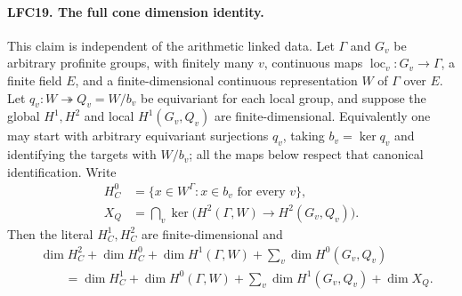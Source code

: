 \documentclass[11pt,a4paper]{article}
\numberwithin{equation}{section}
\theoremstyle{remark}\newtheorem{remark}[theorem]{Remark}
\begin{document}
\paragraph{LFC19. The full cone dimension identity.}
\label{claim:LFC19}
This claim is independent of the arithmetic linked data.
Let \(\Gamma\) and \(G_v\) be arbitrary profinite groups,
with finitely many \(v\), continuous maps
\(\operatorname{loc}_v:G_v\to\Gamma\), a finite field \(E\),
and a finite-dimensional continuous representation \(W\) of
\(\Gamma\) over \(E\).
Let \(q_v:W\twoheadrightarrow Q_v=W/b_v\) be equivariant
for each local group, and suppose the global \(H^1,H^2\)
and local \(H^1(G_v,Q_v)\) are finite-dimensional.
Equivalently one may start with arbitrary equivariant
surjections \(q_v\), taking \(b_v=\ker q_v\) and identifying
the targets with \(W/b_v\); all the maps below respect
that canonical identification.
Write
\[
 \begin{split}
 H^0_C&=\{x\in W^\Gamma:x\in b_v\text{ for every }v\},\\
 X_Q&=\bigcap_v\ker\bigl(H^2(\Gamma,W)\to H^2(G_v,Q_v)\bigr).
 \end{split}
 \]
Then the literal \(H^1_C,H^2_C\) are finite-dimensional and
\[
 \begin{split}
 &\dim H^2_C+\dim H^0_C+\dim H^1(\Gamma,W)
                       +\sum_v\dim H^0(G_v,Q_v)\\
 &\qquad=\dim H^1_C+\dim H^0(\Gamma,W)
                       +\sum_v\dim H^1(G_v,Q_v)+\dim X_Q.
 \end{split}                                           \tag{LFC.29}
\]
\end{document}
